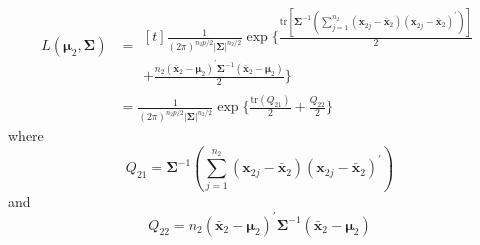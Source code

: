 \begin{align*}
    L(\bm{\mu}_{2}, \bm{\Sigma})
    & =
    \begin{multlined}[t]
        \frac{1}{{(2\pi)}^{n_{2}p/2}{|\bm{\Sigma}|}^{n_{2}/2}}
        \exp
        \Bigg\{
            \frac{
            \text{tr}
            \left[
                \bm{\Sigma}^{-1}
                \left(
                    \sum_{j=1}^{n_{2}}
                    (\textbf{x}_{2j} - \bar{\textbf{x}}_{2})
                    {(\textbf{x}_{2j} - \bar{\textbf{x}}_{2})}^{\prime}
                \right)
            \right]
            }{2} \\
            +
            \frac{
                n_{2}
                {(\bar{\textbf{x}}_{2} - \bm{\mu}_{2})}^{\prime}
                \bm{\Sigma}^{-1}
                (\bar{\textbf{x}}_{2} - \bm{\mu}_{2})
            }{2}
        \Bigg\}
    \end{multlined} \\
    & =
    \frac{1}{{(2\pi)}^{n_{2}p/2}{|\bm{\Sigma}|}^{n_{2}/2}}
        \exp
        \Bigg\{
            \frac{\text{tr}(Q_{21})}{2}
            +
            \frac{Q_{22}}{2}
        \Bigg\}
\end{align*}
where
\[
    Q_{21}
    =
    \bm{\Sigma}^{-1}
    \left(
        \sum_{j=1}^{n_{2}}
        (\textbf{x}_{2j} - \bar{\textbf{x}}_{2})
        {(\textbf{x}_{2j} - \bar{\textbf{x}}_{2})}^{\prime}
    \right)
\]
and
\[
    Q_{22}
    =
    n_{2}
    {(\bar{\textbf{x}}_{2} - \bm{\mu}_{2})}^{\prime}
    \bm{\Sigma}^{-1}
    (\bar{\textbf{x}}_{2} - \bm{\mu}_{2})
\]

